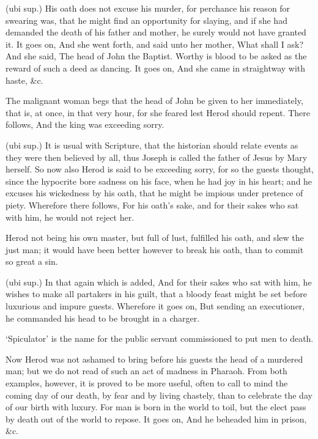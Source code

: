  (ubi sup.) His oath does not excuse his murder, for perchance his reason for swearing was, that he might find an opportunity for slaying, and if she had demanded the death of his father and mother, he surely would not have granted it. It goes on, And she went forth, and said unto her mother, What shall I ask? And she said, The head of John the Baptist. Worthy is blood to be asked as the reward of such a deed as dancing. It goes on, And she came in straightway with haste, \&c.

 The malignant woman begs that the head of John be given to her immediately, that is, at once, in that very hour, for she feared lest Herod should repent. There follows, And the king was exceeding sorry.

 (ubi sup.) It is usual with Scripture, that the historian should relate events as they were then believed by all, thus Joseph is called the father of Jesus by Mary herself. So now also Herod is said to be exceeding sorry, for so the guests thought, since the hypocrite bore sadness on his face, when he had joy in his heart; and he excuses his wickedness by his oath, that he might be impious under pretence of piety. Wherefore there follows, For his oath’s sake, and for their sakes who sat with him, he would not reject her.

 Herod not being his own master, but full of lust, fulfilled his oath, and slew the just man; it would have been better however to break his oath, than to commit so great a sin.

 (ubi sup.) In that again which is added, And for their sakes who sat with him, he wishes to make all partakers in his guilt, that a bloody feast might be set before luxurious and impure guests. Wherefore it goes on, But sending an executioner, he commanded his head to be brought in a charger.

 ‘Spiculator’ is the name for the public servant commissioned to put men to death.

 Now Herod was not ashamed to bring before his guests the head of a murdered man; but we do not read of such an act of madness in Pharaoh. From both examples, however, it is proved to be more useful, often to call to mind the coming day of our death, by fear and by living chastely, than to celebrate the day of our birth with luxury. For man is born in the world to toil, but the elect pass by death out of the world to repose. It goes on, And he beheaded him in prison, \&c.

